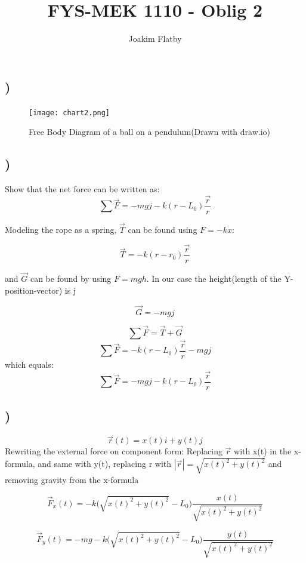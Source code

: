 \documentclass[a4paper,10pt,norsk]{article}
\title{FYS-MEK 1110 - Oblig 2}
\author{Joakim Flatby}
\begin{document}
\maketitle
\section{}


\subsection{)}

\begin{figure}[h!]
        \centering 
        \texttt{[image: chart2.png]} 
        \caption{Free Body Diagram of a ball on a pendulum(Drawn with draw.io)}
\end{figure}

\subsection{)}
Show that the net force can be written as:
\[\sum{\vec{F} = -mgj - k(r-L_{0}) \frac{\vec{r}}{r}}\]

Modeling the rope as a spring, $\vec{T}$ can be found using $F = -kx$:

\[\vec{T} = -k(r-r_{0})\frac{\vec{r}}{r}\]

and $\vec{G}$ can be found by using $F = mgh$. In our case the height(length of the Y-position-vector) is j

\[\vec{G} = -mgj\]

\[\sum{\vec{F}} = \vec{T} + \vec{G}\]
\[\sum{\vec{F} = -k(r-L_{0}) \frac{\vec{r}}{r}} -mgj\]
which equals:
\[\sum{\vec{F} = -mgj - k(r-L_{0}) \frac{\vec{r}}{r}}\]

\subsection{)}

\[\vec{r}(t) = x(t)i + y(t)j\]
Rewriting the external force on component form:
Replacing $\vec{r}$ with x(t) in the x-formula, and same with y(t), replacing r with $| \vec{r} | = \sqrt{x(t)^{2} + y(t)^{2}}$ and removing gravity from the x-formula

\[\vec{F}_{x}(t) = -k\Big(\sqrt{x(t)^{2} + y(t)^{2}} - L_{0} \Big)\frac{x(t)}{\sqrt{x(t)^{2} + y(t)^{2}}}\]

\[\vec{F}_{y}(t) = -mg - k\Big(\sqrt{x(t)^{2} + y(t)^{2}} - L_{0} \Big)\frac{y(t)}{\sqrt{x(t)^{2} + y(t)^{2}}}\]
\end{document}
